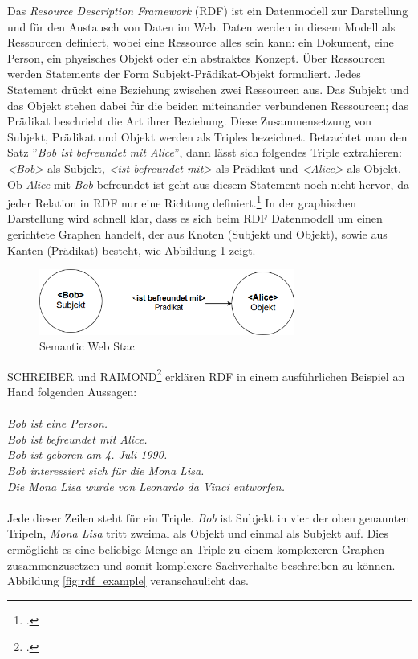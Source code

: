 \documentclass[12pt,a4paper]{article}
\begin{document}
Das \textit{Resource Description Framework} (RDF) ist ein Datenmodell zur Darstellung und für den Austausch von Daten im Web. Daten werden in diesem Modell als Ressourcen definiert, wobei eine Ressource alles sein kann: ein Dokument, eine Person, ein physisches Objekt oder ein abstraktes Konzept. Über Ressourcen werden Statements der Form Subjekt-Prädikat-Objekt formuliert. Jedes Statement drückt eine Beziehung zwischen zwei Ressourcen aus. Das Subjekt und das Objekt stehen dabei für die beiden miteinander verbundenen Ressourcen; das Prädikat beschriebt die Art ihrer Beziehung. Diese Zusammensetzung von Subjekt, Prädikat und Objekt werden als Triples bezeichnet. Betrachtet man den Satz ''\textit{Bob ist befreundet mit Alice}'', dann lässt sich folgendes Triple extrahieren: \textit{<Bob>} als Subjekt, \textit{<ist befreundet mit>} als Prädikat und \textit{<Alice>} als Objekt. Ob \textit{Alice} mit \textit{Bob} befreundet ist geht aus diesem Statement noch nicht hervor, da jeder Relation in RDF nur eine Richtung definiert.\footcite[Vgl.][S.16-21]{powers2003practical} In der graphischen Darstellung wird schnell klar, dass es sich beim RDF Datenmodell um einen gerichtete Graphen handelt, der aus Knoten (Subjekt und Objekt), sowie aus Kanten (Prädikat) besteht, wie Abbildung \ref{fig:triple} zeigt.
\begin{figure}[h]
  \centering
	\includegraphics[width=0.75\textwidth]{img/triple.png}  
    \caption[ Semantic Web Stac]{ Semantic Web Stac}
  	\label{fig:triple}
\end{figure}
SCHREIBER und RAIMOND\footcite[Vgl.][]{schreiber2014rdf} erklären RDF in einem ausführlichen Beispiel an Hand folgenden Aussagen:
\\
\\
\textit{Bob ist eine Person.\\
Bob ist befreundet mit Alice.\\
Bob ist geboren am 4. Juli 1990. \\
Bob interessiert sich für die Mona Lisa.\\
Die Mona Lisa wurde von Leonardo da Vinci entworfen.}
\\
\\
Jede dieser Zeilen steht für ein Triple. \textit{Bob} ist Subjekt in vier der oben genannten Tripeln, \textit{Mona Lisa} tritt zweimal als Objekt und einmal als Subjekt auf. Dies ermöglicht es eine beliebige Menge an Triple zu einem komplexeren Graphen zusammenzusetzen und somit komplexere Sachverhalte beschreiben zu können. Abbildung \ref{fig:rdf_example} veranschaulicht das.
\end{document}
